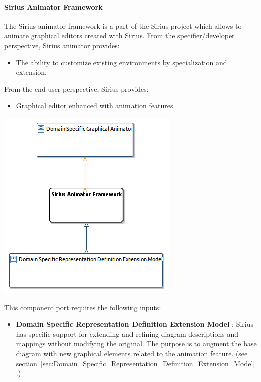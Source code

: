 \documentclass{gemoc} %
\begin{document}
\paragraph{Sirius Animator Framework}
\label{sec:Sirius_Animator_Framework}

The Sirius animator framework is a part of the Sirius project which allows to animate graphical editors created with Sirius.
From the specifier/developer perspective, Sirius animator provides:
\begin{itemize}
\item The ability to customize existing environments by specialization and extension.
\end{itemize}
From the end user perspective, Sirius provides:
\begin{itemize}
\item Graphical editor enhanced with animation features.
\end{itemize}
\begin{center}
\includegraphics*[trim=0.0cm 0.0cm 0cm 0.0cm, clip=true]{../images/generated/Generated_Sirius_Animator_Framework.png}
\end{center}

This component port requires the following inputs:
\begin{itemize}
  \item \textbf{Domain Specific Representation Definition Extension Model} :
Sirius has specific support for extending and refining diagram descriptions and mappings without modifying the original. The purpose is to augment the base diagram with new graphical elements related to the animation feature.
(see section~\ref{sec:Domain_Specific_Representation_Definition_Extension_Model}.)
\end{itemize}
\end{document}

